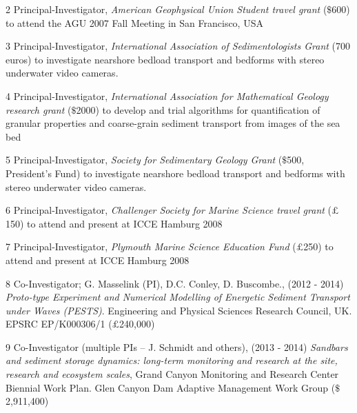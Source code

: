 \documentclass[margin,line]{resume}
\begin{document}
\begin{resume}
\begin{footnotesize}
\begin{list1}
	\item[2] Principal-Investigator, {\sl American Geophysical Union Student travel grant} ($\$$600) to attend the AGU 2007 Fall Meeting in San Francisco, USA\\
	
	\item[3] Principal-Investigator, {\sl International Association of Sedimentologists Grant} (700 euros) to investigate nearshore bedload transport and bedforms with stereo underwater video cameras.\\
	
	\item[4] Principal-Investigator, {\sl International Association for Mathematical Geology research grant} ($\$$2000) to develop and trial algorithms for quantification of granular properties and coarse-grain sediment transport from images of the sea bed\\
	
	\item[5] Principal-Investigator, {\sl Society for Sedimentary Geology Grant} ($\$$500, President's Fund) to investigate nearshore bedload transport and bedforms with stereo underwater video cameras.\\
	
	\item[6] Principal-Investigator, {\sl Challenger Society for Marine Science travel grant} ($\pounds$150) to attend and present at ICCE Hamburg 2008\\
	
	\item[7] Principal-Investigator, {\sl Plymouth Marine Science Education Fund} ($\pounds$250) to attend and present at ICCE Hamburg 2008\\

	\item[8] Co-Investigator; G. Masselink (PI), D.C. Conley, D. Buscombe., (2012 - 2014) {\sl Proto-type Experiment and Numerical Modelling of Energetic Sediment Transport under Waves (PESTS)}. Engineering and Physical Sciences Research Council, UK. EPSRC EP/K000306/1 ($\pounds$240,000)\\

	\item[9] Co-Investigator (multiple PIs – J. Schmidt and others), (2013 - 2014) {\sl Sandbars and sediment storage dynamics: long-term monitoring and research at the site, research and ecosystem scales}, Grand Canyon Monitoring and Research Center Biennial Work Plan. Glen Canyon Dam Adaptive Management Work Group ($\$$2,911,400)\\


\end{list1}
\end{footnotesize}
\end{resume}
\end{document}
